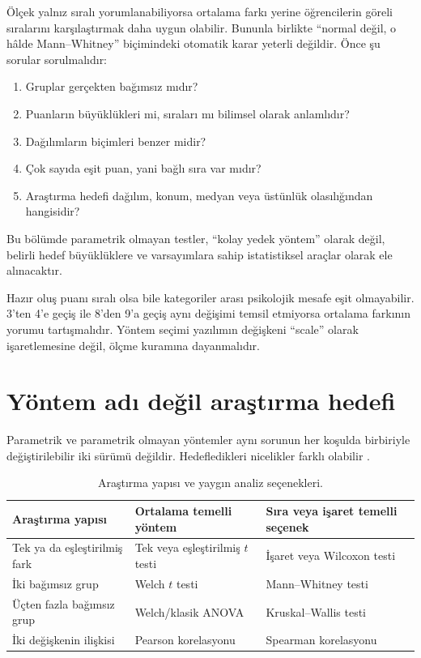 Ölçek yalnız sıralı yorumlanabiliyorsa ortalama farkı yerine öğrencilerin
göreli sıralarını karşılaştırmak daha uygun olabilir. Bununla birlikte
``normal değil, o hâlde Mann--Whitney'' biçimindeki otomatik karar yeterli
değildir. Önce şu sorular sorulmalıdır:

\begin{enumerate}
  \item Gruplar gerçekten bağımsız mıdır?
  \item Puanların büyüklükleri mi, sıraları mı bilimsel olarak anlamlıdır?
  \item Dağılımların biçimleri benzer midir?
  \item Çok sayıda eşit puan, yani bağlı sıra var mıdır?
  \item Araştırma hedefi dağılım, konum, medyan veya üstünlük olasılığından hangisidir?
\end{enumerate}

Bu bölümde parametrik olmayan testler, ``kolay yedek yöntem'' olarak değil,
belirli hedef büyüklüklere ve varsayımlara sahip istatistiksel araçlar olarak
ele alınacaktır.

\begin{researchbox}
Hazır oluş puanı sıralı olsa bile kategoriler arası psikolojik mesafe eşit
olmayabilir. 3'ten 4'e geçiş ile 8'den 9'a geçiş aynı değişimi temsil etmiyorsa
ortalama farkının yorumu tartışmalıdır. Yöntem seçimi yazılımın değişkeni
``scale'' olarak işaretlemesine değil, ölçme kuramına dayanmalıdır.
\end{researchbox}

\section{Yöntem adı değil araştırma hedefi}

Parametrik ve parametrik olmayan yöntemler aynı sorunun her koşulda birbiriyle
değiştirilebilir iki sürümü değildir. Hedefledikleri nicelikler farklı olabilir
\cite{hollander2013,lehmann2006,wasserman2006}.

\begin{table}[htbp]
\centering
\caption{Araştırma yapısı ve yaygın analiz seçenekleri.}
\begin{tabular}{@{}p{}p{}p{}@{}}
\toprule
Araştırma yapısı & Ortalama temelli yöntem & Sıra veya işaret temelli seçenek \\
\midrule
Tek ya da eşleştirilmiş fark & Tek veya eşleştirilmiş $t$ testi & İşaret veya Wilcoxon testi \\
İki bağımsız grup & Welch $t$ testi & Mann--Whitney testi \\
Üçten fazla bağımsız grup & Welch/klasik ANOVA & Kruskal--Wallis testi \\
İki değişkenin ilişkisi & Pearson korelasyonu & Spearman korelasyonu \\
\bottomrule
\end{tabular}
\end{table}


